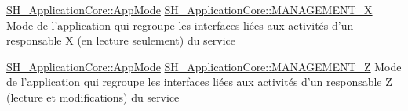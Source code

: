 \hyperlink{classSimpleHotel_1_1SH__ApplicationCore_a5fea25d06c20cd22de5a2221c3a2dddc}{S\-H\-\_\-\-Application\-Core\-::\-App\-Mode} \hyperlink{classSimpleHotel_1_1SH__ApplicationCore_a5fea25d06c20cd22de5a2221c3a2dddca7d966b7aab9fa700be8aca4d01cea71a}{S\-H\-\_\-\-Application\-Core\-::\-M\-A\-N\-A\-G\-E\-M\-E\-N\-T\-\_\-\-X} Mode de l'application qui regroupe les interfaces liées aux activités d'un responsable X (en lecture seulement) du service

\hyperlink{classSimpleHotel_1_1SH__ApplicationCore_a5fea25d06c20cd22de5a2221c3a2dddc}{S\-H\-\_\-\-Application\-Core\-::\-App\-Mode} \hyperlink{classSimpleHotel_1_1SH__ApplicationCore_a5fea25d06c20cd22de5a2221c3a2dddca5a1a605e06eead8cba816fe77b3d825a}{S\-H\-\_\-\-Application\-Core\-::\-M\-A\-N\-A\-G\-E\-M\-E\-N\-T\-\_\-\-Z} Mode de l'application qui regroupe les interfaces liées aux activités d'un responsable Z (lecture et modifications) du service

